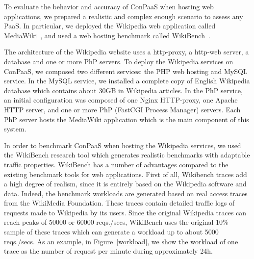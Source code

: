 To evaluate the behavior and accuracy of ConPaaS when hosting web applications, we prepared a realistic and complex enough scenario to assess any PaaS. In particular, we deployed the Wikipedia web application called MediaWiki~\cite{mediawiki}, and used a web hosting benchmark called WikiBench~\cite{wikibench}. 


The architecture of the Wikipedia website uses a http-proxy, a http-web server, a database and one or more PhP servers. To deploy the Wikipedia services on ConPaaS, we composed two different services: the PHP web hosting and MySQL service. In the MySQL service, we installed a complete copy of English Wikipedia database which contains about 30GB in Wikipedia articles. In the PhP service, an initial configuration was composed of one Nginx HTTP-proxy, one Apache HTTP server, and one or more PhP (FastCGI Process Manager) servers. Each PhP server hosts the MediaWiki application which is the main component of this system. 

In order to benchmark ConPaaS when hosting the Wikipedia services, we used the WikiBench research tool which generates realistic benchmarks with adaptable traffic properties. WikiBench has a number of advantages compared to the existing benchmark tools for web applications. First of all, Wikibench traces add a high degree of realism, since it is entirely based on the Wikipedia software and data. Indeed, the benchmark workloads are generated based on real access traces from the WikiMedia Foundation. These traces contain detailed  traffic logs of requests made to Wikipedia by its users. Since the original Wikipedia traces can reach peaks of 50000 or 60000 reqs./secs, WikiBench uses the original 10\% sample of these traces which can generate a workload up to about 5000 reqs./secs. As an example, in Figure~\ref{workload}, we show the workload of one trace as the number of request per minute during approximately 24h. 





